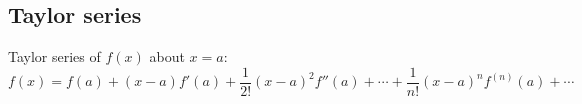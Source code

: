 \documentclass[letterpaper,landscape,10pt]{article}
\newenvironment{mydescription}
{\begin{description}
	\setlength{\itemsep}{0pt}
	\setlength{\parskip}{0pt}
	\setlength{\parsep}{-1pt}}
{\end{description}}
\begin{document}
{\begin{multicols}{3}
   
	\subsection*{Taylor series}
		Taylor series of $f(x)$ about $x=a$:\\
		\[ f(x) = f(a) + (x-a)f'(a) + \frac{1}{2!}(x-a)^2f''(a) + \cdots +
				\frac{1}{n!}(x-a)^nf^{(n)}(a) + \cdots \]
	
	

\end{multicols}}
\end{document}
